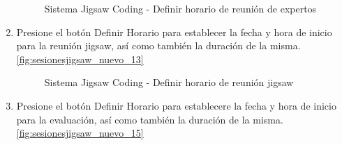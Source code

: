 \begin{enumerate}
	\begin{figure}
		\centering
		\caption{Sistema Jigsaw Coding - Definir horario de reunión de expertos}
		\label{fig:sesionesjigsaw_nuevo_11}
	\end{figure}
	\item Presione el botón Definir Horario para establecer la fecha y hora de inicio para la reunión jigsaw, así como también la duración de la misma. \autoref{fig:sesionesjigsaw_nuevo_13}
	\begin{figure}
		\centering
		\caption{Sistema Jigsaw Coding - Definir horario de reunión jigsaw}
		\label{fig:sesionesjigsaw_nuevo_13}
	\end{figure}
	\item Presione el botón Definir Horario para establecere la fecha y hora de inicio para la evaluación, así como también la duración de la misma. \autoref{fig:sesionesjigsaw_nuevo_15}
	\begin{figure}[h]

\end{figure}
\end{enumerate}
